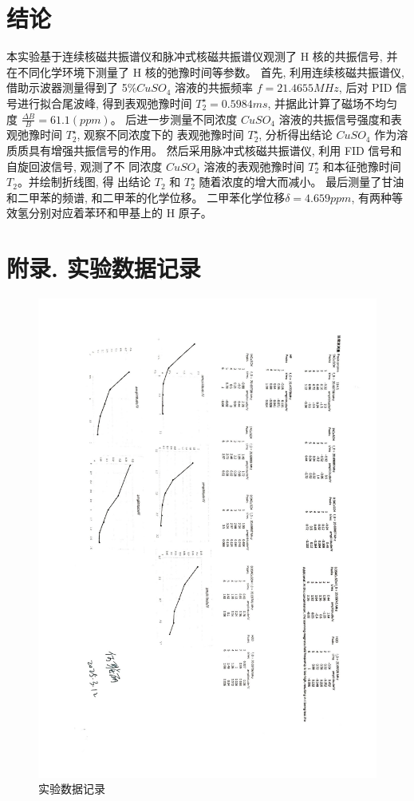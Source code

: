 \documentclass[12pt,a4paper]{article}
\begin{document}
\section{结论}
本实验基于连续核磁共振谱仪和脉冲式核磁共振谱仪观测了 H 核的共振信号, 并在不同化学环境下测量了 H 核的弛豫时间等参数。
首先, 利用连续核磁共振谱仪, 借助示波器测量得到了 5\%$CuS O_4$ 溶液的共振频率 $f = 21.4655 MHz$, 后对 PID 信号进行拟合尾波峰, 得到表观弛豫时间
$T_2^{\star} = 0.5984ms$, 并据此计算了磁场不均匀度 $\frac{\Delta B}{B}= 61.1(ppm)$。
后进一步测量不同浓度 $CuS O_4$ 溶液的共振信号强度和表观弛豫时间 $T_2^{\star}$, 观察不同浓度下的
表观弛豫时间 $T_2^{\star}$, 分析得出结论 $CuS O_4$ 作为溶质质具有增强共振信号的作用。
然后采用脉冲式核磁共振谱仪, 利用 FID 信号和自旋回波信号, 观测了不
同浓度 $CuS O_4$ 溶液的表观弛豫时间 $T_2^{\star}$ 和本征弛豫时间 $T_2$。并绘制折线图, 得
出结论 $T_2$ 和 $T_2^{\star}$ 随着浓度的增大而减小。
最后测量了甘油和二甲苯的频谱, 和二甲苯的化学位移。 二甲苯化学位移$\delta =4.659ppm$, 有两种等效氢分别对应着苯环和甲基上的 H 原子。

\printbibliography
\newpage
\section{附录. 实验数据记录}
\begin{figure}[H]
    \centering
    \includegraphics[width=\textwidth]{Raw.jpg}
    \caption{实验数据记录}
\end{figure}
\end{document}
